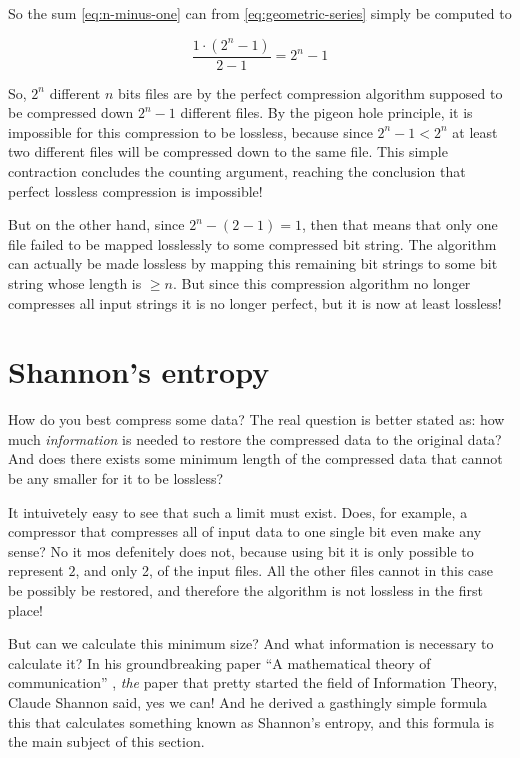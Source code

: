 So the sum \eqref{eq:n-minus-one} can from \eqref{eq:geometric-series}
simply be computed to

\begin{equation*}
  \frac{1 \cdot (2^{n} - 1)}{2 -1} = 2^{n} - 1
\end{equation*}

So, $2^n$ different $n$ bits files are by the perfect compression
algorithm supposed to be compressed down $2^n - 1$ different files. By
the pigeon hole principle, it is impossible for this compression to be
lossless, because since $2^n - 1 < 2^n$ at least two different files
will be compressed down to the same file. This simple contraction
concludes the counting argument, reaching the conclusion that perfect
lossless compression is impossible!

But on the other hand, since $2^n - (2^{} - 1) = 1$, then that means
that only one file failed to be mapped losslessly to some compressed
bit string. The algorithm can actually be made lossless by mapping
this remaining bit strings to some bit string whose length is $\ge
n$. But since this compression algorithm no longer compresses all input strings it
is no longer perfect, but it is now at least lossless!

\section{Shannon's entropy}

How do you best compress some data? The real question is better stated
as: how much \textit{information} is needed to restore the compressed
data to the original data? And does there exists some minimum length
of the compressed data that cannot be any smaller for it to be
lossless?

It intuivetely easy to see that such a limit must exist. Does, for
example, a compressor that compresses all of input data to one single
bit even make any sense? No it mos defenitely does not, because using
bit it is only possible to represent $2$, and only 2, of the input
files. All the other files cannot in this case be possibly be
restored, and therefore the algorithm is not lossless in the first
place!

But can we calculate this minimum size? And what information is
necessary to calculate it? In his groundbreaking paper ``A
mathematical theory of communication''
\cite{Shannon:2001:MTC:584091.584093}, \textit{the} paper that pretty
started the field of Information Theory, Claude Shannon said, yes we
can! And he derived a gasthingly simple formula this that calculates
something known as Shannon's entropy, and this formula is the main
subject of this section.


